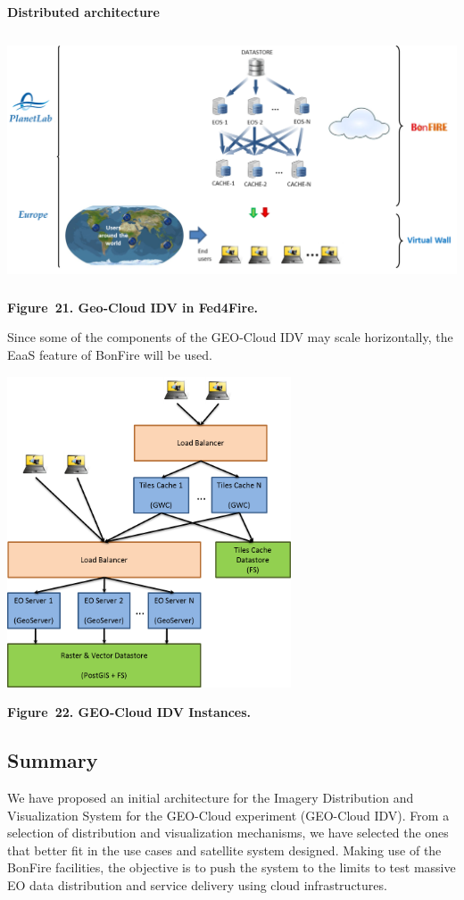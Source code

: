 \documentclass[a4paper]{article}
\begin{document}
\paragraph[Distributed architecture]{Distributed architecture}
{\centering 
\includegraphics[width=5.63567in,height=2.85821in]{out-img28.png} \par}

{\centering\bfseries
Figure\ 21. Geo-Cloud IDV in Fed4Fire.
\par}

Since some of the components of the GEO-Cloud IDV may scale
horizontally, the EaaS feature of BonFire will be used.

{\centering 
\includegraphics[width=3.31233in,height=3.62481in]{out-img29.png} \par}

{\centering\bfseries
Figure\ 22. GEO-Cloud IDV Instances.
\par}

\subsection[Summary]{Summary}
\hypertarget{Toc381777208}{}We have proposed an initial architecture for
the Imagery Distribution and Visualization System for the GEO-Cloud
experiment (GEO-Cloud IDV). From a selection of distribution and
visualization mechanisms, we have selected the ones that better fit in
the use cases and satellite system designed. Making use of the BonFire
facilities, the objective is to push the system to the limits to test
massive EO data distribution and service delivery using cloud
infrastructures.
\end{document}
